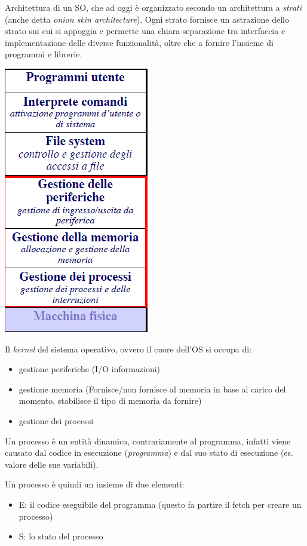 \documentclass[
  paper=a4,
  oneside  ,captions=tableheading
]{scrbook}
\providecommand{\tightlist}{%
  \setlength{\itemsep}{0pt}\setlength{\parskip}{0pt}}
\begin{document}
Architettura di un SO, che ad oggi è organizzato secondo un architettura
a \emph{strati} (anche detta \emph{onion skin architecture}). Ogni
strato fornisce un astrazione dello strato sui cui si appoggia e
permette una chiara separazione tra interfaccia e implementazione delle
diverse funzionalità, oltre che a fornire l'insieme di programmi e
librerie.

\includegraphics{./image/image-2020112323365770.png}

Il \emph{kernel} del sistema operativo, ovvero il cuore dell'OS si
occupa di:

\begin{itemize}
\tightlist
\item
  gestione periferiche (I/O informazioni)
\item
  gestione memoria (Fornisce/non fornisce al memoria in base al carico
  del momento, stabilisce il tipo di memoria da fornire)
\item
  gestione dei processi
\end{itemize}

Un processo è un entità dinamica, contrariamente al programma, infatti
viene causato dal codice in esecuzione (\emph{programma}) e dal suo
stato di esecuzione (es. valore delle sue variabili).

Un processo è quindi un insieme di due elementi:

\begin{itemize}
\tightlist
\item
  E: il codice eseguibile del programma (questo fa partire il fetch per
  creare un processo)
\item
  S: lo stato del processo
\end{itemize}
\end{document}
